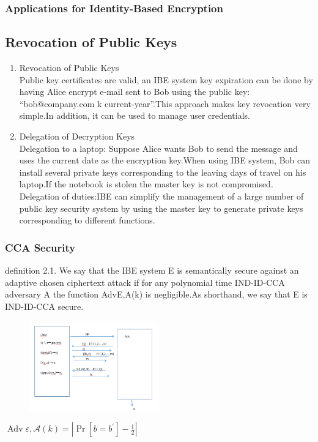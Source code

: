 \documentclass{beamer}
\begin{document}
\begin{frame}
\frametitle{ Applications for Identity-Based Encryption}
\subsection{ Revocation of Public Keys}
\begin{enumerate}
\item  Revocation of Public Keys\\
Public key certificates are valid, an IBE system key expiration can be done by
having Alice encrypt e-mail sent to Bob using the public key: “bob@company.com
k current-year”.This approach makes key revocation very simple.In addition, it can be used to manage user credentials.
\item Delegation of Decryption Keys\\
Delegation to a laptop:
Suppose Alice wants Bob to send the message and uses the current date as the
encryption key.When using IBE system, Bob can install several private keys corresponding to the leaving days of travel on his laptop.If the notebook is stolen the master key is not compromised.\\
Delegation of duties:IBE can simplify the management of a large number of public key security system by using the master key to generate private keys corresponding to different functions.
\end{enumerate}

\end{frame}


\begin{frame}
\frametitle{CCA Security}
definition 2.1. We say that the IBE system E is semantically secure against an
adaptive chosen ciphertext attack if for any polynomial time IND-ID-CCA adversary A the function AdvE,A(k) is negligible.As shorthand, we say that E is
IND-ID-CCA secure.
\begin{figure}[H]
		\centering %
		\includegraphics[width=0.5\textwidth]{./figure/CCA} %
		
		\label{e} %

\end{figure}
\centering
$\operatorname{Adv} \varepsilon, \mathcal{A}(k)=\left|\operatorname{Pr}\left[b=b^{\prime}\right]-\frac{1}{2}\right|$
\end{frame}
\end{document}

